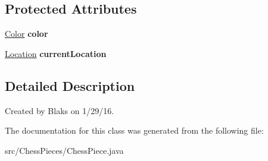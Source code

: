 \subsection*{Protected Attributes}
\begin{DoxyCompactItemize}
\item 
\hyperlink{enum_chess_pieces_1_1_color}{Color} {\bfseries color}\hypertarget{class_chess_pieces_1_1_chess_piece_a06daeee01ede96cd6aa78db766108862}{}\label{class_chess_pieces_1_1_chess_piece_a06daeee01ede96cd6aa78db766108862}

\item 
\hyperlink{class_chess_pieces_1_1_location}{Location} {\bfseries current\+Location}\hypertarget{class_chess_pieces_1_1_chess_piece_a3855d471b3379cc52f7c76898b7cd1da}{}\label{class_chess_pieces_1_1_chess_piece_a3855d471b3379cc52f7c76898b7cd1da}

\end{DoxyCompactItemize}


\subsection{Detailed Description}
Created by Blaks on 1/29/16. 

The documentation for this class was generated from the following file\+:\begin{DoxyCompactItemize}
\item 
src/\+Chess\+Pieces/Chess\+Piece.\+java\end{DoxyCompactItemize}
